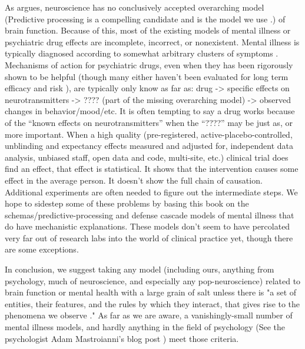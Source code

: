 \documentclass[12pt,letterpaper]{book}
\begin{document}
As \textcite{hoelNeuroscience} argues, neuroscience has no conclusively accepted overarching model (Predictive processing is a compelling candidate and is the model we use \cite{clark2015surfing}.) of brain function. Because of this, most of the existing models of mental illness or psychiatric drug effects are incomplete, incorrect, or nonexistent. Mental illness is typically diagnosed according to somewhat arbitrary clusters of symptoms \cite{apaDSM}. Mechanisms of action for psychiatric drugs, even when they has been rigorously shown to be helpful (though many either haven’t been evaluated for long term efficacy and risk \cite{leuchtDecline}), are typically only know as far as: drug -> specific effects on neurotransmitters -> ???? (part of the missing overarching model) -> observed changes in behavior/mood/etc. It is often tempting to say a drug works because of the “known effects on neurotransmitters” when the “????” may be just as, or more important. When a high quality (pre-registered, active-placebo-controlled, unblinding and expectancy effects measured and adjusted for, independent data analysis, unbiased staff, open data and code, multi-site, etc.) clinical trial does find an effect, that effect is statistical. It shows that the intervention causes some effect in the average person. It doesn’t show the full chain of causation. Additional experiments are often needed to figure out the intermediate steps. We hope to sidestep some of these problems by basing this book on the schemas/predictive-processing and defense cascade models of mental illness that do have mechanistic explanations. These models don't seem to have percolated very far out of research labs into the world of clinical practice yet, though there are some exceptions.

In conclusion, we suggest taking any model (including ours, anything from psychology, much of neuroscience, and especially any pop-neuroscience) related to brain function or mental health with a large grain of salt unless there is "a set of entities, their features, and the rules by which they interact, that gives rise to the phenomena we observe \cite{mechanisticModels}." As far as we are aware, a vanishingly-small number of mental illness models, and hardly anything in the field of psychology (See the psychologist Adam Mastroianni's blog post \textcite{MastroianniPsychology}) meet those criteria.
\end{document}
